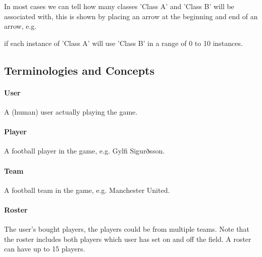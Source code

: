 \documentclass{article}
\begin{document}

In most cases we can tell how many classes 'Class A' and 'Class B' will be associated with, this is shown by placing an arrow at the beginning and end of an arrow, e.g.


if each instance of 'Class A' will use 'Class B' in a range of 0 to 10 instances.

\subsection{Terminologies and Concepts}
\paragraph{User} A (human) user actually playing the game.
\paragraph{Player} A football player in the game, e.g. Gylfi Sigurðsson.
\paragraph{Team} A football team in the game, e.g. Manchester United.
\paragraph{Roster} The user's bought players, the players could be from multiple teams. Note that the roster includes both players which user has set on and off the field. A roster can have up to 15 players.
\end{document}
